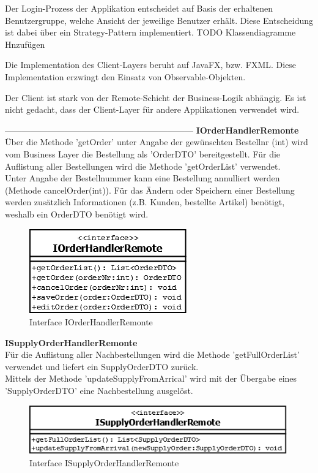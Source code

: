 Der Login-Prozess der Applikation entscheidet auf Basis der erhaltenen Benutzergruppe, welche Ansicht der jeweilige Benutzer erhält. Diese Entscheidung ist dabei über ein Strategy-Pattern implementiert. 
TODO Klassendiagramme Hnzufügen

Die Implementation des Client-Layers beruht auf JavaFX, bzw. FXML. Diese Implementation erzwingt den Einsatz von Observable-Objekten.

Der Client ist stark von der Remote-Schicht der Business-Logik abhängig. Es ist nicht gedacht, dass der Client-Layer für andere Applikationen verwendet wird.
\newline

------------------------------------------------------------------
\textbf{IOrderHandlerRemonte}\\
Über die Methode 'getOrder' unter Angabe der gewünschten Bestellnr (int) wird vom Business Layer die Bestellung als 'OrderDTO' bereitgestellt. Für die Auflistung aller Bestellungen wird die Methode 'getOrderList' verwendet.\\
Unter Angabe der Bestellnummer kann eine Bestellung annulliert werden (Methode cancelOrder(int)). Für das Ändern oder Speichern einer Bestellung werden zusätzlich Informationen (z.B. Kunden, bestellte Artikel) benötigt, weshalb ein OrderDTO benötigt wird.


\begin{figure}[H]
	\includegraphics[width=0.3\linewidth]{Images/IOrderHandlerRemonte}
	\caption{Interface IOrderHandlerRemonte}
	\label{fig:if-IOrderHandlerRemonte}
\end{figure}

\textbf{ISupplyOrderHandlerRemonte}\\
Für die Auflistung aller Nachbestellungen wird die Methode 'getFullOrderList' verwendet und liefert ein SupplyOrderDTO zurück.\\
Mittels der Methode 'updateSupplyFromArrical' wird mit der Übergabe eines 'SupplyOrderDTO' eine Nachbestellung ausgelöst. 
\begin{figure}[H]
	\includegraphics[width=0.6\linewidth]{Images/ISupplyOrderHandlerRemonte}
	\caption{Interface ISupplyOrderHandlerRemonte}
	\label{fig:if-ISupplyOrderHandler}
\end{figure}


